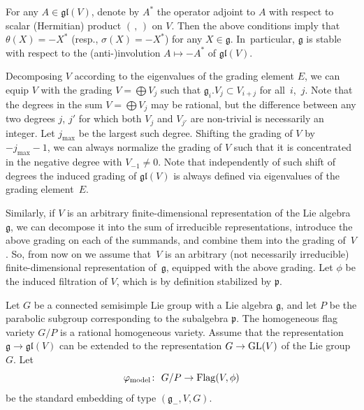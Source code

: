 \documentclass[10pt,a4paper]{amsart}
\newcommand{\g}{\mathfrak g}
\newcommand{\gl}{\mathfrak{gl}}
\newcommand{\pf}{\mathfrak p}
\newcommand{\V}{V}
\newcommand{\Flag}{\operatorname{Flag}}
\numberwithin{equation}{section}
\begin{document}
For any $A\in\gl(\V)$, denote by $A^*$ the operator adjoint to $A$ with respect
to scalar (Hermitian) product $(\,,\,)$ on $\V$. Then the above conditions imply
that $\theta(X)=-X^*$ (resp., $\sigma(X)=-X^*$) for any $X\in\g$. In~particular, $\g$ is stable with respect to the (anti-)involution $A\mapsto -A^*$ of $\gl(\V)$.


Decomposing $\V$ according to the eigenvalues of the grading element $E$, we
can equip $\V$ with the grading $\V=\bigoplus \V_{j}$ such that $\g_i.\V_j\subset \V_{i+j}$ for all~$i$,~$j$. Note that the degrees in the sum $\V=\bigoplus \V_{j}$ may be rational, but the difference between any two degrees $j$, $j'$ for which both $\V_{j}$ and $\V_{j'}$ are non-trivial is necessarily an integer. Let $j_{\max }$ be the largest such degree. Shifting the grading of $\V$ by $-j_{\max }-1$, we can always normalize the grading of $\V$ such that it is concentrated in the negative degree with $\V_{-1}\ne 0$. Note that independently of such shift of degrees the induced grading of $\gl(\V)$ is always defined via eigenvalues of the grading element~$E$.

Similarly, if $\V$ is an arbitrary finite-dimensional representation of the Lie algebra $\g$, we can decompose it into the sum of irreducible representations, introduce the above grading on each of the summands, and combine them into the grading of~$\V$. So, from now on we assume that~$\V$ is an arbitrary (not necessarily irreducible) finite-dimensional representation of~$\g$, equipped with the above grading. Let $\phi$ be the induced filtration of $\V$, which is by definition stabilized by $\pf$.

Let $G$ be a connected semisimple Lie group with a Lie algebra $\g$, and let $P$ be the parabolic subgroup corresponding to the subalgebra $\pf$. The homogeneous flag variety $G/P$ is a rational homogeneous variety.
Assume that the representation $\g\to\gl(\V)$ can be extended to the representation $G\to {\rm GL}(\V)$ of the Lie group $G$. Let
\[
\varphi_{{\rm model}}\colon\ G/P \to \Flag(\V,\phi)
\]
be the standard embedding of type $(\g_{-},\V,G)$.
\end{document}
